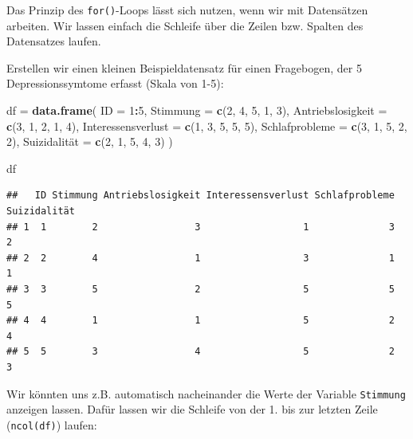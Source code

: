 \documentclass[
]{book}
\newenvironment{Shaded}{\begin{snugshade}}{\end{snugshade}}
\newcommand{\AttributeTok}[1]{\textcolor[rgb]{0.13,0.29,0.53}{#1}}
\newcommand{\DecValTok}[1]{\textcolor[rgb]{0.00,0.00,0.81}{#1}}
\newcommand{\FunctionTok}[1]{\textcolor[rgb]{0.13,0.29,0.53}{\textbf{#1}}}
\newcommand{\NormalTok}[1]{#1}
\newcommand{\OtherTok}[1]{\textcolor[rgb]{0.56,0.35,0.01}{#1}}
\newcommand{\SpecialCharTok}[1]{\textcolor[rgb]{0.81,0.36,0.00}{\textbf{#1}}}
\begin{document}
Das Prinzip des \texttt{for()}-Loops lässt sich nutzen, wenn wir mit Datensätzen arbeiten. Wir lassen einfach die Schleife über die Zeilen bzw. Spalten des Datensatzes laufen.

Erstellen wir einen kleinen Beispieldatensatz für einen Fragebogen, der 5 Depressionssymtome erfasst (Skala von 1-5):

\begin{Shaded}
\begin{Highlighting}[]
\NormalTok{df }\OtherTok{=} \FunctionTok{data.frame}\NormalTok{(}
  \AttributeTok{ID =} \DecValTok{1}\SpecialCharTok{:}\DecValTok{5}\NormalTok{,}
  \AttributeTok{Stimmung =} \FunctionTok{c}\NormalTok{(}\DecValTok{2}\NormalTok{, }\DecValTok{4}\NormalTok{, }\DecValTok{5}\NormalTok{, }\DecValTok{1}\NormalTok{, }\DecValTok{3}\NormalTok{),}
  \AttributeTok{Antriebslosigkeit =} \FunctionTok{c}\NormalTok{(}\DecValTok{3}\NormalTok{, }\DecValTok{1}\NormalTok{, }\DecValTok{2}\NormalTok{, }\DecValTok{1}\NormalTok{, }\DecValTok{4}\NormalTok{),}
  \AttributeTok{Interessensverlust =} \FunctionTok{c}\NormalTok{(}\DecValTok{1}\NormalTok{, }\DecValTok{3}\NormalTok{, }\DecValTok{5}\NormalTok{, }\DecValTok{5}\NormalTok{, }\DecValTok{5}\NormalTok{),}
  \AttributeTok{Schlafprobleme =} \FunctionTok{c}\NormalTok{(}\DecValTok{3}\NormalTok{, }\DecValTok{1}\NormalTok{, }\DecValTok{5}\NormalTok{, }\DecValTok{2}\NormalTok{, }\DecValTok{2}\NormalTok{),}
\NormalTok{  Suizidalität }\OtherTok{=} \FunctionTok{c}\NormalTok{(}\DecValTok{2}\NormalTok{, }\DecValTok{1}\NormalTok{, }\DecValTok{5}\NormalTok{, }\DecValTok{4}\NormalTok{, }\DecValTok{3}\NormalTok{)}
\NormalTok{)}

\NormalTok{df}
\end{Highlighting}
\end{Shaded}

\begin{verbatim}
##   ID Stimmung Antriebslosigkeit Interessensverlust Schlafprobleme Suizidalität
## 1  1        2                 3                  1              3            2
## 2  2        4                 1                  3              1            1
## 3  3        5                 2                  5              5            5
## 4  4        1                 1                  5              2            4
## 5  5        3                 4                  5              2            3
\end{verbatim}

Wir könnten uns z.B. automatisch nacheinander die Werte der Variable \texttt{Stimmung} anzeigen lassen. Dafür lassen wir die Schleife von der 1. bis zur letzten Zeile (\texttt{ncol(df)}) laufen:
\end{document}
